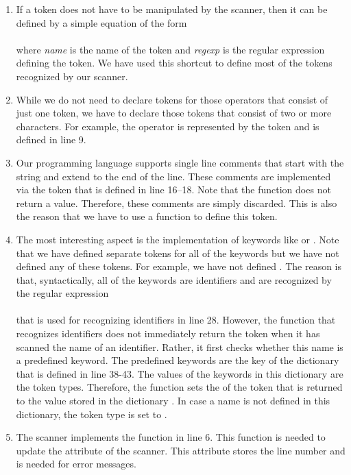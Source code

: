 \begin{enumerate}
\item If a token does not have to be manipulated by the scanner, then it can be defined by a simple equation 
      of the form 
      \\[0.2cm]
      \hspace*{1.3cm}
      \\[0.2cm]
      where \textsl{name} is the name of the token and \textsl{regexp} is the regular expression defining the
      token.  We have used this shortcut to define most of the tokens recognized by our scanner.
\item While we do not need to declare tokens for those operators that consist of just one token, 
      we have to declare those tokens that consist of two or more characters.  For example, the operator
      \quoted{==} is represented by the token  and is defined in line 9.
\item Our programming language supports single line comments that start with the string \quoted{//} and extend
      to the end of the line.  These comments are implemented via the token  that is defined in
      line 16--18.  Note that the function  does not return a value.  Therefore,
      these comments are simply discarded.  This is also the reason that we have to use a function to define
      this token.
\item The most interesting aspect is the implementation of keywords like  or .
      Note that we have defined separate tokens for all of the keywords but we have not defined any
      of these tokens.  For example, we have not defined .
      The reason is that, syntactically, all of the keywords are identifiers and are recognized by the regular
      expression
      \\[0.2cm]
      \hspace*{1.3cm}
      \\[0.2cm]
      that is used for recognizing identifiers in line 28.  However, the function  that recognizes
      identifiers does not immediately return the token  when it has scanned the name of an
      identifier.  Rather, it first checks whether this name is a predefined keyword.  The predefined keywords
      are the key of the dictionary  that is defined in line 38-43.  The values of the
      keywords in this dictionary are the token types.  Therefore, the function  sets the
       of the token that is returned to the value stored in the dictionary .
      In case a name is not defined in this dictionary, the token type is set to .
\item The scanner implements the function  in line 6.  This function is needed
      to update the attribute  of the scanner.  This attribute stores the line number and is
      needed for error messages.
\end{enumerate}

